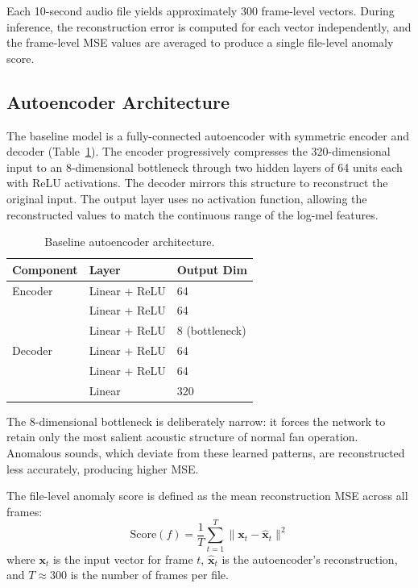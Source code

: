 \documentclass[sigconf]{acmart}
\begin{document}
Each 10-second audio file yields approximately 300 frame-level vectors. During inference, the reconstruction error is computed for each vector independently, and the frame-level MSE values are averaged to produce a single file-level anomaly score.

\subsection{Autoencoder Architecture}

The baseline model is a fully-connected autoencoder with symmetric encoder and decoder (Table~\ref{tab:arch}). The encoder progressively compresses the 320-dimensional input to an 8-dimensional bottleneck through two hidden layers of 64 units each with ReLU activations. The decoder mirrors this structure to reconstruct the original input. The output layer uses no activation function, allowing the reconstructed values to match the continuous range of the log-mel features.

\begin{table}[t]
\centering
\caption{Baseline autoencoder architecture.}
\label{tab:arch}
\begin{tabular}{l l l}
\toprule
Component & Layer & Output Dim \\
\midrule
Encoder & Linear + ReLU & 64 \\
& Linear + ReLU & 64 \\
& Linear + ReLU & 8 (bottleneck) \\
\midrule
Decoder & Linear + ReLU & 64 \\
& Linear + ReLU & 64 \\
& Linear & 320 \\
\bottomrule
\end{tabular}
\end{table}

The 8-dimensional bottleneck is deliberately narrow: it forces the network to retain only the most salient acoustic structure of normal fan operation. Anomalous sounds, which deviate from these learned patterns, are reconstructed less accurately, producing higher MSE.

The file-level anomaly score is defined as the mean reconstruction MSE across all frames:
\begin{equation}
    \text{Score}(f) = \frac{1}{T} \sum_{t=1}^{T} \| \mathbf{x}_t - \hat{\mathbf{x}}_t \|^2
\end{equation}
where $\mathbf{x}_t$ is the input vector for frame $t$, $\hat{\mathbf{x}}_t$ is the autoencoder's reconstruction, and $T \approx 300$ is the number of frames per file.
\end{document}
